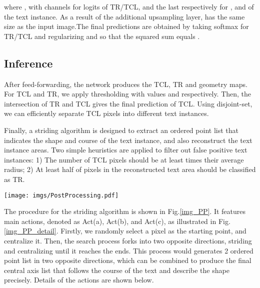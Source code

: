 \documentclass[runningheads]{llncs}
\begin{document}
\vspace{-2mm}

where , with  channels for logits of TR/TCL, and the last  respectively for ,  and  of the text instance. As a result of the additional upsampling layer,  has the same size as the input image.The final predictions are obtained by taking softmax for TR/TCL and regularizing  and  so that the squared sum equals . 


\subsection{Inference} \label{sec:inference}

After feed-forwarding, the network produces the TCL, TR and geometry maps. For TCL and TR, we apply thresholding with values  and  respectively. Then, the intersection of TR and TCL gives the final prediction of TCL. Using disjoint-set, we can efficiently separate TCL pixels into different text instances.

Finally, a striding algorithm is designed to extract an ordered point list that indicates the shape and course of the text instance, and also reconstruct the text instance areas. Two simple heuristics are applied to filter out false positive text instances: 1) The number of TCL pixels should be at least  times their average radius; 2) At least half of pixels in the reconstructed text area should be classified as TR.

\begin{figure*}
\vspace{-3mm}
\begin{centering}
\texttt{[image: imgs/PostProcessing.pdf]}
\par\end{centering}
\vspace{-4mm}
\caption{Framework of Post-processing Algorithm. Act(a) Centralizing: relocate a given point to the central axis; Act(b) Striding: a directional search towards the ends of text instances; Act(c) Sliding: a reconstruction  by sliding a circle along the central axis.}
\label{img_PP}
\vspace{-3mm}
\end{figure*}

The procedure for the striding algorithm is shown in Fig.\ref{img_PP}. It features  main  actions, denoted as Act(a), Act(b), and Act(c), as illustrated in Fig.\ref{img_PP_detail}. Firstly, we randomly select a pixel as the starting point, and centralize it. Then, the search process forks into two opposite directions, striding and centralizing until it reaches the ends. This process would generates 2 ordered point list in two opposite directions, which can be combined to produce the final central axis list that follows the course of the text and describe the shape precisely. Details of the  actions are shown below.
\end{document}
